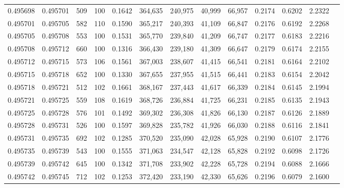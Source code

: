 \begin{tabular}{rrrrrrrrrrrrr}
0.495698 & 0.495701 &   509 & 100 &                                     0.1642 & 364,635 & 240,975 &  40,999 &  66,957 & 0.2174 & 0.6202 & 2.2322 \\
0.495701 & 0.495705 &   582 & 110 &                                     0.1590 & 365,217 & 240,393 &  41,109 &  66,847 & 0.2176 & 0.6192 & 2.2268 \\
0.495705 & 0.495708 &   553 & 100 &                                     0.1531 & 365,770 & 239,840 &  41,209 &  66,747 & 0.2177 & 0.6183 & 2.2216 \\
0.495708 & 0.495712 &   660 & 100 &                                     0.1316 & 366,430 & 239,180 &  41,309 &  66,647 & 0.2179 & 0.6174 & 2.2155 \\
0.495712 & 0.495715 &   573 & 106 &                                     0.1561 & 367,003 & 238,607 &  41,415 &  66,541 & 0.2181 & 0.6164 & 2.2102 \\
0.495715 & 0.495718 &   652 & 100 &                                     0.1330 & 367,655 & 237,955 &  41,515 &  66,441 & 0.2183 & 0.6154 & 2.2042 \\
0.495718 & 0.495721 &   512 & 102 &                                     0.1661 & 368,167 & 237,443 &  41,617 &  66,339 & 0.2184 & 0.6145 & 2.1994 \\
0.495721 & 0.495725 &   559 & 108 &                                     0.1619 & 368,726 & 236,884 &  41,725 &  66,231 & 0.2185 & 0.6135 & 2.1943 \\
0.495725 & 0.495728 &   576 & 101 &                                     0.1492 & 369,302 & 236,308 &  41,826 &  66,130 & 0.2187 & 0.6126 & 2.1889 \\
0.495728 & 0.495731 &   526 & 100 &                                     0.1597 & 369,828 & 235,782 &  41,926 &  66,030 & 0.2188 & 0.6116 & 2.1841 \\
0.495731 & 0.495735 &   692 & 102 &                                     0.1285 & 370,520 & 235,090 &  42,028 &  65,928 & 0.2190 & 0.6107 & 2.1776 \\
0.495735 & 0.495739 &   543 & 100 &                                     0.1555 & 371,063 & 234,547 &  42,128 &  65,828 & 0.2192 & 0.6098 & 2.1726 \\
0.495739 & 0.495742 &   645 & 100 &                                     0.1342 & 371,708 & 233,902 &  42,228 &  65,728 & 0.2194 & 0.6088 & 2.1666 \\
0.495742 & 0.495745 &   712 & 102 &                                     0.1253 & 372,420 & 233,190 &  42,330 &  65,626 & 0.2196 & 0.6079 & 2.1600 \\

\end{tabular}
